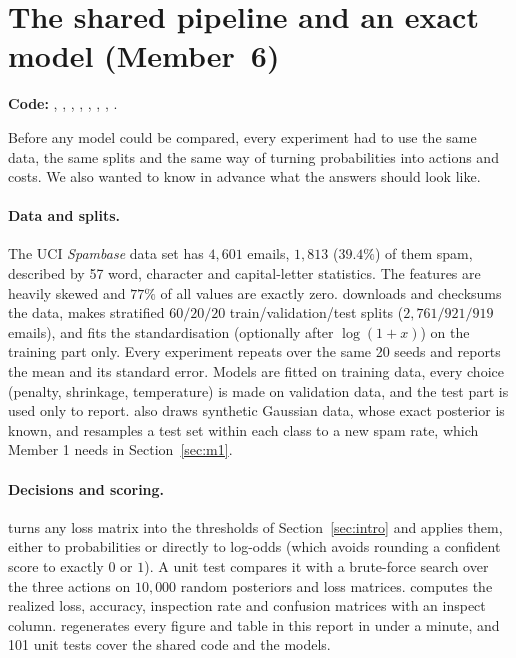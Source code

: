 \section{The shared pipeline and an exact model (Member~6)}
\label{sec:m6}
\textbf{Code:} , , , ,
, , , .

Before any model could be compared, every experiment had to use the same data, the same splits and
the same way of turning probabilities into actions and costs. We also wanted to know in advance what
the answers should look like.

\paragraph{Data and splits.}
The UCI \emph{Spambase} data set has $4{,}601$ emails, $1{,}813$ ($39.4\%$) of them spam, described by
57 word, character and capital-letter statistics. The features are heavily skewed and $77\%$ of all
values are exactly zero.  downloads and checksums the data, makes stratified
$60/20/20$ train/validation/test splits ($2{,}761/921/919$ emails), and fits the standardisation
(optionally after $\log(1+x)$) on the training part only. Every experiment repeats over the same 20
seeds and reports the mean and its standard error. Models are fitted on training data, every
choice (penalty, shrinkage, temperature) is made on validation data, and the test part is used only
to report.  also draws synthetic Gaussian data, whose exact posterior is known, and
resamples a test set within each class to a new spam rate, which Member 1 needs in
Section~\ref{sec:m1}.

\paragraph{Decisions and scoring.}
 turns any loss matrix into the thresholds of Section~\ref{sec:intro} and applies
them, either to probabilities or directly to log-odds (which avoids rounding a confident score to
exactly $0$ or $1$). A unit test compares it with a brute-force search over the three actions on
$10{,}000$ random posteriors and loss matrices.  computes the realized loss, accuracy,
inspection rate and confusion matrices with an inspect column.  regenerates every
figure and table in this report in under a minute, and 101 unit tests cover the shared code and the
models.

